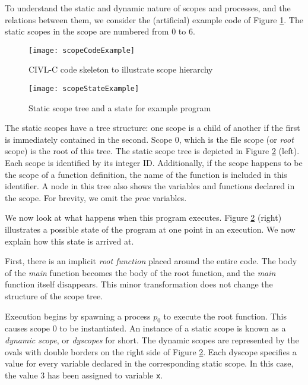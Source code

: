 To understand the static and dynamic nature of scopes and processes,
and the relations between them, we consider the (artificial) example
code of Figure \ref{fig:scopecodeex}.  The static scopes in the scope
are numbered from $0$ to $6$.

\begin{figure}[t]
  \centering
  \texttt{[image: scopeCodeExample]}
  \caption{CIVL-C code skeleton to illustrate scope hierarchy}
  \label{fig:scopecodeex}
\end{figure}

\begin{figure}
  \centering
  \texttt{[image: scopeStateExample]}
  \caption{Static scope tree and a state for example program}
  \label{fig:scopestateex}
\end{figure}

The static scopes have a tree structure: one scope is a child of
another if the first is immediately contained in the second.  Scope 0,
which is the file scope (or \emph{root} scope) is the root of this
tree.  The static scope tree is depicted in Figure
\ref{fig:scopestateex} (left).  Each scope is identified by its
integer ID.  Additionally, if the scope happens to be the scope of a
function definition, the name of the function is included in this
identifier.  A node in this tree also shows the variables and
functions declared in the scope.  For brevity, we omit the \emph{proc}
variables.

We now look at what happens when this program executes.  Figure
\ref{fig:scopestateex} (right) illustrates a possible state of the
program at one point in an execution.  We now explain how
this state is arrived at.

First, there is an implicit \emph{root function} placed around the
entire code.  The body of the \emph{main} function becomes the body
of the root function, and the \emph{main} function itself disappears.
This minor transformation does not change the structure of the scope
tree.

Execution begins by spawning a process $p_0$ to execute the root
function.  This causes scope $0$ to be instantiated.  An instance of a
static scope is known as a \emph{dynamic scope}, or \emph{dyscopes}
for short.  The dynamic scopes are represented by the ovals with
double borders on the right side of Figure \ref{fig:scopestateex}.
Each dyscope specifies a value for every variable declared in the
corresponding static scope.  In this case, the value $3$ has been
assigned to variable \texttt{x}.

